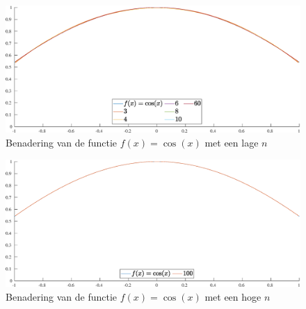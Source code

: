 \documentclass[a4paper, 12pt, titlepage, fleqn]{article}
\begin{document}
\begin{figure}
\centering
\includegraphics[width=\textwidth]{../Afbeeldingen/cos_nul_laag.eps}
\caption{Benadering van de functie $f(x) = \cos(x)$ met een lage $n$}
\label{fig:lageNCosNul}
\end{figure}

\begin{figure}
\centering
\includegraphics[width=\textwidth]{../Afbeeldingen/cos_nul_hoog.eps}
\caption{Benadering van de functie $f(x) = \cos(x)$ met een hoge $n$}
\label{fig:hogeNCosNul}
\end{figure}
\end{document}
